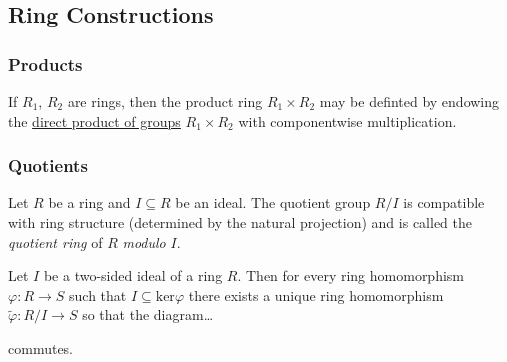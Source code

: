 \subsection{Ring Constructions}\label{ringconstructions}

\subsubsection{Products}\label{ringproducts}
If $R_1$, $R_2$ are rings, then the product ring $R_1 \times R_2$ may be definted by endowing the
\hyperref[groupproduct]{direct product of groups} $R_1 \times R_2$ with componentwise multiplication.

\subsubsection{Quotients}\label{ringquotients}
Let $R$ be a ring and $I \subseteq R$ be an ideal. The quotient group $R/I$ is compatible with ring structure (determined
by the natural projection) and is called the \emph{quotient ring} of $R$ \emph{modulo} $I$.

\begin{theorem}
\label{quotientringthm}
Let $I$ be a two-sided ideal of a ring $R$. Then for every ring homomorphism $\varphi: R \rightarrow S$ such that $I \subseteq \textrm{ker}\varphi$
there exists a unique ring homomorphism $\tilde \varphi : R/I \rightarrow S$ so that the diagram\dots
\begin{figure}[H]
\centering

\end{figure}
\noindent commutes.
\end{theorem}